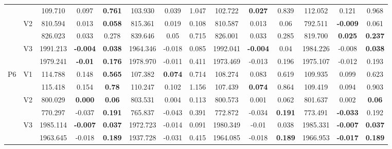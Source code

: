 \documentclass[12pt,a4paper]{article}
\begin{document}
\begin{sidewaystable}[ht]
{\begin{tabular}{cc|ccc|ccc|ccc|ccc|}
   &  & 109.710 & 0.097 & \textbf{0.761} & 103.930 & 0.039 & 1.047 & 102.722 & \textbf{0.027} & 0.839 & 112.052 & 0.121 & 0.968 \\ 
   & \multirow{2}{*}{V2} & 810.594 & 0.013 & \textbf{0.058} & 815.361 & 0.019 & 0.108 & 810.587 & 0.013 & 0.06 & 792.511 & \textbf{-0.009} & 0.061 \\ 
   &  & 826.023 & 0.033 & 0.278 & 839.646 & 0.05 & 0.715 & 826.001 & 0.033 & 0.285 & 819.700 & \textbf{0.025} & \textbf{0.237} \\ 
   & \multirow{2}{*}{V3} & 1991.213 & \textbf{-0.004} & \textbf{0.038} & 1964.346 & -0.018 & 0.085 & 1992.041 & \textbf{-0.004} & 0.04 & 1984.226 & -0.008 & \textbf{0.038} \\ 
   &  & 1979.241 & \textbf{-0.01} & \textbf{0.176} & 1978.970 & -0.011 & 0.411 & 1973.469 & -0.013 & 0.196 & 1975.107 & -0.012 & 0.193 \\ 
   \hline \hline\multirow{6}{*}{P6} & \multirow{2}{*}{V1} & 114.788 & 0.148 & \textbf{0.565} & 107.382 & \textbf{0.074} & 0.714 & 108.274 & 0.083 & 0.619 & 109.935 & 0.099 & 0.623 \\ 
   &  & 115.418 & 0.154 & \textbf{0.78} & 110.247 & 0.102 & 1.156 & 107.439 & \textbf{0.074} & 0.864 & 109.419 & 0.094 & 0.903 \\ 
   & \multirow{2}{*}{V2} & 800.029 & \textbf{0.000} & \textbf{0.06} & 803.531 & 0.004 & 0.113 & 800.573 & 0.001 & 0.062 & 801.637 & 0.002 & \textbf{0.06} \\ 
   &  & 770.297 & -0.037 & \textbf{0.191} & 765.837 & -0.043 & 0.391 & 772.872 & -0.034 & \textbf{0.191} & 773.491 & \textbf{-0.033} & 0.192 \\ 
   & \multirow{2}{*}{V3} & 1985.114 & \textbf{-0.007} & \textbf{0.037} & 1972.723 & -0.014 & 0.091 & 1980.349 & -0.01 & 0.038 & 1985.331 & \textbf{-0.007} & \textbf{0.037} \\ 
   &  & 1963.645 & -0.018 & \textbf{0.189} & 1937.728 & -0.031 & 0.415 & 1964.085 & -0.018 & \textbf{0.189} & 1966.953 & \textbf{-0.017} & \textbf{0.189} \\ 
   \hline
\end{tabular}
}
\end{sidewaystable}
\end{document}
